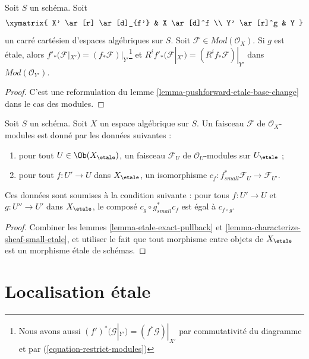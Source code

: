 \begin{lemma}
\label{lemma-pushforward-etale-base-change-modules}
Soit $S$ un schéma. Soit
$$
\xymatrix{
X' \ar[r] \ar[d]_{f'} & X \ar[d]^f \\
Y' \ar[r]^g & Y
}
$$
un carré cartésien d'espaces algébriques sur $S$. Soit
$\mathcal{F} \in \textit{Mod}(\mathcal{O}_X)$. Si $g$ est \'etale, alors
$f'_*(\mathcal{F}|_{X'}) = (f_*\mathcal{F})|_{Y'}$\footnote{Nous avons aussi
$(f')^*(\mathcal{G}|_{Y'}) = (f^*\mathcal{G})|_{X'}$
par commutativité du diagramme et par (\ref{equation-restrict-modules})} et
$R^if'_*(\mathcal{F}|_{X'}) = (R^if_*\mathcal{F})|_{Y'}$ dans
$\textit{Mod}(\mathcal{O}_{Y'})$.
\end{lemma}

\begin{proof}
C'est une reformulation du
lemme \ref{lemma-pushforward-etale-base-change}
dans le cas des modules.
\end{proof}

\begin{lemma}
\label{lemma-characterize-module-small-etale}
Soit $S$ un schéma. Soit $X$ un espace algébrique sur $S$.
Un faisceau $\mathcal{F}$ de $\mathcal{O}_X$-modules est donné par les
données suivantes :
\begin{enumerate}
\item pour tout $U \in \Ob(X_\etale)$, un faisceau
$\mathcal{F}_U$ de $\mathcal{O}_U$-modules sur $U_\etale$ ;
\item pour tout $f : U' \to U$ dans $X_\etale$, un isomorphisme
$c_f : f_{small}^*\mathcal{F}_U \to \mathcal{F}_{U'}$.
\end{enumerate}
Ces données sont soumises à la condition suivante : pour tous $f : U' \to U$
et $g : U'' \to U'$ dans $X_\etale$, le composé
$c_g \circ g_{small}^*c_f$ est égal à $c_{f \circ g}$.
\end{lemma}

\begin{proof}
Combiner les lemmes \ref{lemma-etale-exact-pullback}
et \ref{lemma-characterize-sheaf-small-etale}, et utiliser le fait que
tout morphisme entre objets de $X_\etale$ est un morphisme \'etale
de schémas.
\end{proof}







\section{Localisation \'etale}
\label{section-localize}

